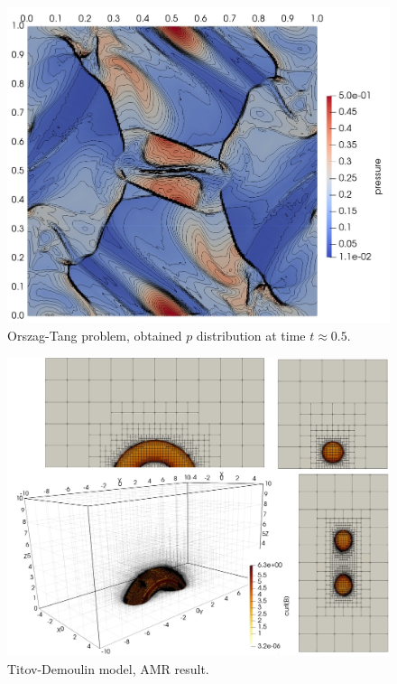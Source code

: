 \documentclass[journal,transmag]{IEEEtran}
\begin{document}
\begin{figure}
	\begin{center}
		\includegraphics[width=1.0\columnwidth]{ot.jpg}
	\caption{Orszag-Tang problem, obtained $p$ distribution at time $t \approx 0.5$.}
	\label{figure:ot}
	\end{center}
\end{figure}

\begin{figure}
	\begin{center}
		\includegraphics[width=1.0\columnwidth]{td6.jpg}
	\caption{Titov-Demoulin model, AMR result.}
	\label{figure:td}
	\end{center}
\end{figure}
\end{document}
